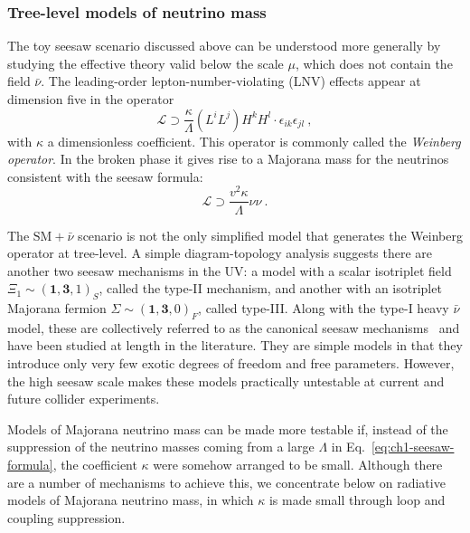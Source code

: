 \subsubsection{Tree-level models of neutrino mass}

The toy seesaw scenario discussed above can be understood more generally by
studying the effective theory valid below the scale $\mu$, which does not
contain the field $\bar{\nu}$. The leading-order lepton-number-violating (LNV)
effects appear at dimension five in the operator
\begin{equation}
  \mathscr{L} \supset \frac{\kappa}{\Lambda} (L^{i}L^{j})H^{k}H^{l} \cdot \epsilon_{ik}\epsilon_{jl} \ ,
\end{equation}
with $\kappa$ a dimensionless coefficient. This operator is commonly called the
\textit{Weinberg operator}. In the broken phase it gives rise to a Majorana mass
for the neutrinos consistent with the seesaw formula:
\begin{equation}
  \label{eq:ch1-seesaw-formula}
  \mathscr{L} \supset \frac{v^{2} \kappa}{\Lambda} \nu \nu \ .
\end{equation}

The $\text{SM}+\bar{\nu}$ scenario is not the only simplified model that
generates the Weinberg operator at tree-level. A simple diagram-topology
analysis suggests there are another two seesaw mechanisms in the UV: a model
with a scalar isotriplet field $\Xi_{1} \sim (\mathbf{1}, \mathbf{3}, 1)_{S}$,
called the type-II mechanism, and another with an isotriplet Majorana fermion
$\Sigma \sim (\mathbf{1}, \mathbf{3}, 0)_{F}$, called type-III. Along with the
type-I heavy $\bar{\nu}$ model, these are collectively referred to as the
canonical seesaw mechanisms~\cite{MINKOWSKI1977421, Yanagida:1979as,
  GellMann:1980vs, PhysRevLett.44.912, Glashow:1979nm, Magg:1980ut,
  PhysRevD.22.2227, LAZARIDES1981287, Wetterich:1981bx, PhysRevD.23.165,
  Foot:1988aq} and have been studied at length in the literature. They are
simple models in that they introduce only very few exotic degrees of freedom and
free parameters. However, the high seesaw scale makes these models practically
untestable at current and future collider experiments.

Models of Majorana neutrino mass can be made more testable if, instead of the
suppression of the neutrino masses coming from a large $\Lambda$ in
Eq.~\eqref{eq:ch1-seesaw-formula}, the coefficient $\kappa$ were somehow arranged to
be small. Although there are a number of mechanisms to achieve this, we
concentrate below on radiative models of Majorana neutrino mass, in which
$\kappa$ is made small through loop and coupling suppression.

